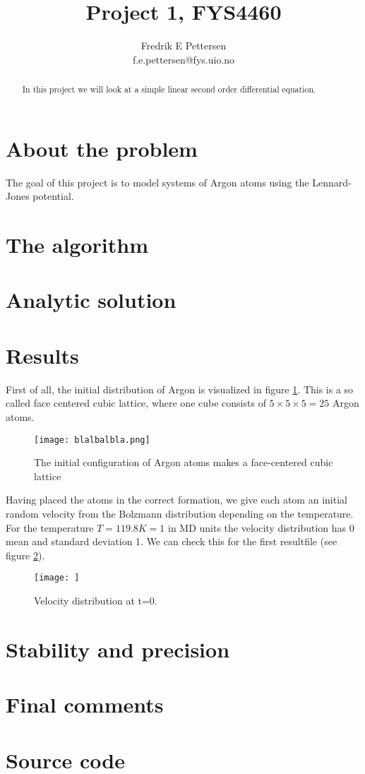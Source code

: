 \documentclass[a4paper,english, 10pt, twoside]{article}
\title{Project 1, FYS4460}
\author{Fredrik E Pettersen\\ f.e.pettersen@fys.uio.no}
\begin{document}
\maketitle

\newpage
\begin{abstract}
In this project we will look at a simple linear second order differential equation.
\end{abstract}
\tableofcontents
\newpage


\section{About the problem}
The goal of this project is to model systems of Argon atoms using the Lennard-Jones potential. 

\section{The algorithm}
\section{Analytic solution}
\section{Results}
First of all, the initial distribution of Argon is visualized in figure \ref{first}. This 
is a so called face centered cubic lattice, where one cube consists of $5\times5\times5 = 25$ 
Argon atoms.
\begin{figure}[H]
\centering
\texttt{[image: blalbalbla.png]}
\caption{The initial configuration of Argon atoms makes a face-centered cubic lattice }
\label{first}
\end{figure} 

Having placed the atoms in the correct formation, we give each atom an initial random velocity 
from the Bolzmann distribution depending on the temperature. \\
For the temperature $T = 119.8K = 1$ in MD units the velocity distribution has 0 mean and 
standard deviation 1. We can check this for the first resultfile (see figure \ref{distribution}).
\begin{figure}[H]
\centering
\texttt{[image: ]}
\caption{Velocity distribution at t=0.}
\label{distribution}
\end{figure}

\section{Stability and precision}
\section{Final comments}

\appendix
\section{Source code}



\end{document}
